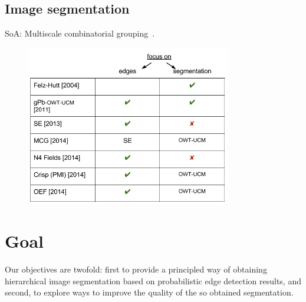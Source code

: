 \subsection{Image segmentation}

SoA: Multiscale combinatorial grouping~\cite{Arbelaez2014multiscale}.

\begin{figure}[ht!]
\centering
  \includegraphics[width=0.8\textwidth,frame]{images/related_work_table.png}
\end{figure}

\section{Goal}
Our objectives are  twofold:  first to provide a principled way of obtaining hierarchical image segmentation based on probabilistic edge detection results, and second, to explore ways to improve the quality of the so %
obtained segmentation.





